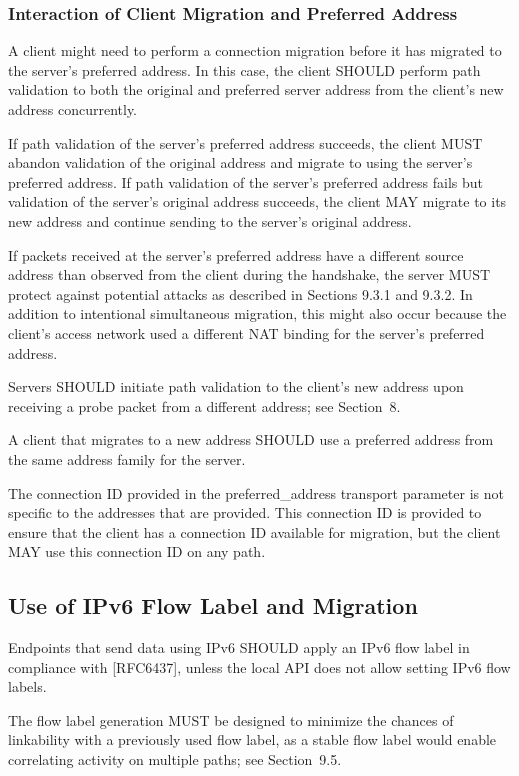 \documentclass{article}
\begin{document}
\subsubsection{Interaction of Client Migration and Preferred Address}

A client might need to perform a connection migration before it has migrated to the server's preferred address.  In this case, the client SHOULD perform path validation to both the original and preferred server address from the client's new address concurrently.

If path validation of the server's preferred address succeeds, the client MUST abandon validation of the original address and migrate to using the server's preferred address.  If path validation of the server's preferred address fails but validation of the server's original address succeeds, the client MAY migrate to its new address and continue sending to the server's original address.

If packets received at the server's preferred address have a different source address than observed from the client during the handshake, the server MUST protect against potential attacks as described in Sections 9.3.1 and 9.3.2.  In addition to intentional simultaneous migration, this might also occur because the client's access network used a different NAT binding for the server's preferred address.

Servers SHOULD initiate path validation to the client's new address upon receiving a probe packet from a different address; see Section~8.

A client that migrates to a new address SHOULD use a preferred address from the same address family for the server.

The connection ID provided in the preferred\_address transport parameter is not specific to the addresses that are provided.  This connection ID is provided to ensure that the client has a connection ID available for migration, but the client MAY use this connection ID on any path.

\subsection{Use of IPv6 Flow Label and Migration}

Endpoints that send data using IPv6 SHOULD apply an IPv6 flow label in compliance with [RFC6437], unless the local API does not allow setting IPv6 flow labels.

The flow label generation MUST be designed to minimize the chances of linkability with a previously used flow label, as a stable flow label would enable correlating activity on multiple paths; see Section~9.5.
\end{document}
